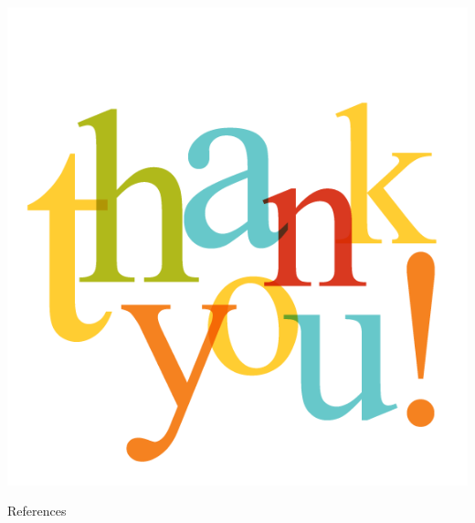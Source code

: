 

\appendix
\begin{frame}[plain]
	\centering
	\includegraphics[width=.7\linewidth]{img/back/thankyou.png}
\end{frame}

\begin{frame}{References}
    \label{references}
    \begingroup
    \footnotesize
    \nocite{*}
    \printbibliography[heading=none]
    \endgroup
\end{frame}
